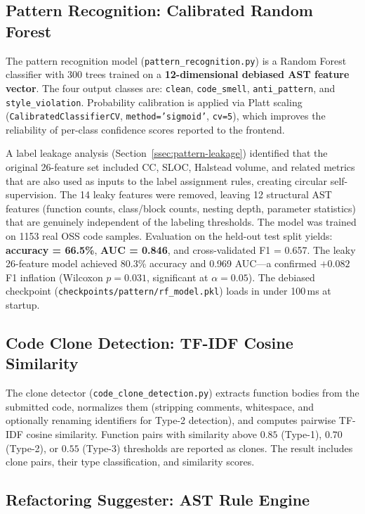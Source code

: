 \documentclass[12pt, oneside]{report}
\begin{document}
\subsection{Pattern Recognition: Calibrated Random Forest}
\label{ssec:pattern}

The pattern recognition model (\texttt{pattern\_recognition.py}) is a Random Forest
classifier with 300 trees trained on a \textbf{12-dimensional debiased AST feature
vector}. The four output classes are: \texttt{clean}, \texttt{code\_smell},
\texttt{anti\_pattern}, and \texttt{style\_violation}. Probability calibration is applied
via Platt scaling (\texttt{CalibratedClassifierCV}, \texttt{method='sigmoid'},
\texttt{cv=5}), which improves the reliability of per-class confidence scores reported to
the frontend.

A label leakage analysis (Section~\ref{ssec:pattern-leakage}) identified that the
original 26-feature set included CC, SLOC, Halstead volume, and related metrics that are
also used as inputs to the label assignment rules, creating circular self-supervision.
The 14 leaky features were removed, leaving 12 structural AST features (function counts,
class/block counts, nesting depth, parameter statistics) that are genuinely independent of
the labeling thresholds. The model was trained on 1153 real OSS code samples.
Evaluation on the held-out test split yields:
\textbf{accuracy = 66.5\%}, \textbf{AUC = 0.846}, and cross-validated F1 = 0.657.
The leaky 26-feature model achieved 80.3\% accuracy and 0.969 AUC---a confirmed
$+0.082$ F1 inflation (Wilcoxon $p=0.031$, significant at $\alpha=0.05$).
The debiased checkpoint (\texttt{checkpoints/pattern/rf\_model.pkl}) loads
in under 100\,ms at startup.

\subsection{Code Clone Detection: TF-IDF Cosine Similarity}
\label{ssec:clones}

The clone detector (\texttt{code\_clone\_detection.py}) extracts function bodies from the
submitted code, normalizes them (stripping comments, whitespace, and optionally renaming
identifiers for Type-2 detection), and computes pairwise TF-IDF cosine similarity.
Function pairs with similarity above $0.85$ (Type-1), $0.70$ (Type-2), or $0.55$ (Type-3)
thresholds are reported as clones. The result includes clone pairs, their type
classification, and similarity scores.

\subsection{Refactoring Suggester: AST Rule Engine}
\label{ssec:refactoring}
\end{document}
